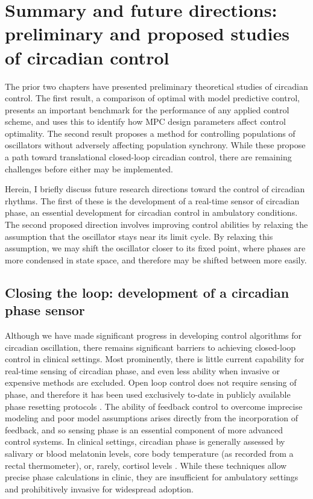 \chapter{Summary and future directions: preliminary and proposed studies of circadian control}

The prior two chapters have presented preliminary theoretical studies of circadian control.
The first result, a comparison of optimal with model predictive control, presents an important benchmark for the performance of any applied control scheme, and uses this to identify how MPC design parameters affect control optimality.
The second result proposes a method for controlling populations of oscillators without adversely affecting population synchrony.
While these propose a path toward translational closed-loop circadian control, there are remaining challenges before either may be implemented.

Herein, I briefly discuss future research directions toward the control of circadian rhythms.
The first of these is the development of a real-time sensor of circadian phase, an essential development for circadian control in ambulatory conditions.
The second proposed direction involves improving control abilities by relaxing the assumption that the oscillator stays near its limit cycle.
By relaxing this assumption, we may shift the oscillator closer to its fixed point, where phases are more condensed in state space, and therefore may be shifted between more easily.

\section{Closing the loop: development of a circadian phase sensor}

Although we have made significant progress in developing control algorithms for circadian oscillation, there remains significant barriers to achieving closed-loop control in clinical settings.
Most prominently, there is little current capability for real-time sensing of circadian phase, and even less ability when invasive or expensive methods are excluded.
Open loop control does not require sensing of phase, and therefore it has been used exclusively to-date in publicly available phase resetting protocols \cite{Walch2016}.
The ability of feedback control to overcome imprecise modeling and poor model assumptions arises directly from the incorporation of feedback, and so sensing phase is an essential component of more advanced control systems.
In clinical settings, circadian phase is generally assessed by salivary or blood melatonin levels, core body temperature (as recorded from a rectal thermometer), or, rarely, cortisol levels \cite{Klerman2002, Chang2012a, StHilaire2012}.
While these techniques allow precise phase calculations in clinic, they are insufficient for ambulatory settings and prohibitively invasive for widespread adoption.

